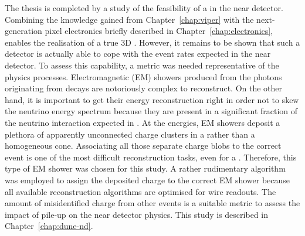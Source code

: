 The thesis is completed by a study of the feasibility of a \lartpc{} in the \dune{} near detector.
Combining the knowledge gained from Chapter~\ref{chap:viper} with the next-generation pixel electronics briefly described in Chapter~\ref{chap:electronics}, enables the realisation of a true 3D \lartpc{}.
However, it remains to be shown that such a detector is actually able to cope with the event rates expected in the near detector.
To assess this capability, a metric was needed representative of the physics processes.
Electromagnetic (EM) showers produced from the photons originating from \Pgpz decays are notoriously complex to reconstruct.
On the other hand, it is important to get their energy reconstruction right in order not to skew the neutrino energy spectrum because they are present in a significant fraction of the neutrino interaction expected in \dune{}.
At the \dune{} energies, EM showers deposit a plethora of apparently unconnected charge clusters in a \lartpc{} rather than a homogeneous cone.
Associating all those separate charge blobs to the correct event is one of the most difficult reconstruction tasks, even for a \lartpc{}.
Therefore, this type of EM shower was chosen for this study.
A rather rudimentary algorithm was employed to assign the deposited charge to the correct EM shower because all available \lartpc{} reconstruction algorithms are optimised for wire readouts.
The amount of misidentified charge from other events is a suitable metric to assess the impact of pile-up on the near detector physics.
This study is described in Chapter~\ref{chap:dune-nd}.
